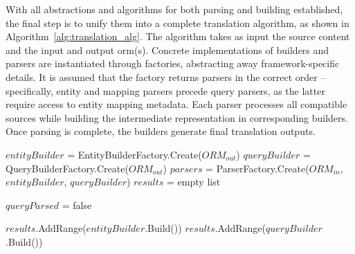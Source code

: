 With all abstractions and algorithms for both parsing and building established, the final step is to unify them into a complete translation algorithm, as shown in Algorithm~\ref{alg:translation_alg}. The algorithm takes as input the source content and the input and output \acrshort{orm}(s). Concrete implementations of builders and parsers are instantiated through factories, abstracting away framework-specific details. It is assumed that the factory returns parsers in the correct order -- specifically, entity and mapping parsers precede query parsers, as the latter require access to entity mapping metadata. Each parser processes all compatible sources while building the intermediate representation in corresponding builders. Once parsing is complete, the builders generate final translation outputs.

\begin{algorithm}[!p]
    \footnotesize
    \DontPrintSemicolon

    

    $entityBuilder$ = EntityBuilderFactory.Create($ORM_{out}$)\;
    $queryBuilder$ = QueryBuilderFactory.Create($ORM_{out}$)\;
    $parsers$ = ParserFactory.Create($ORM_{in}$, $entityBuilder$, $queryBuilder$)\;
    $results$ = empty list\;
    
    $queryParsed$ = false\;

    $results$.AddRange($entityBuilder$.Build())\;
     {
        $results$.AddRange($queryBuilder$.Build())\;
    }
    
    \caption{Translation algorithm}
    \label{alg:translation_alg}
\end{algorithm}